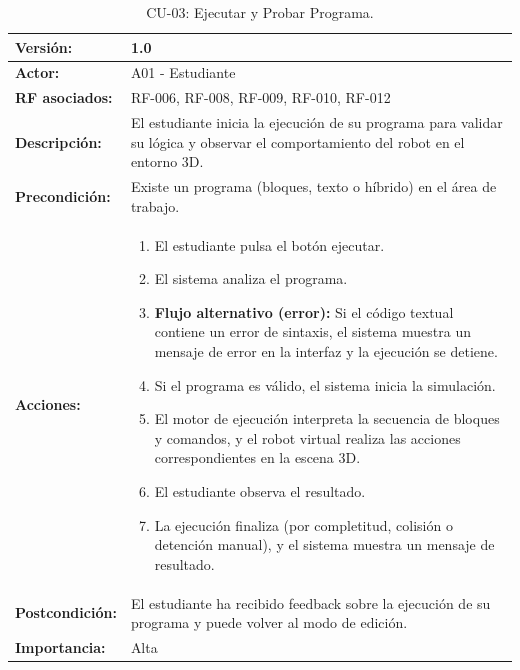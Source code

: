 \begin{table}[H]
	\centering
	\begin{tabularx}{\linewidth}{|p{3cm}|X|}
		\hline
		\textbf{Versión:} & 1.0 \\ \hline
		\textbf{Actor:} & A01 - Estudiante \\ \hline
		\textbf{RF asociados:} & RF-006, RF-008, RF-009, RF-010, RF-012 \\ \hline
		\textbf{Descripción:} & El estudiante inicia la ejecución de su programa para validar su lógica y observar el comportamiento del robot en el entorno 3D. \\ \hline
		\textbf{Precondición:} & Existe un programa (bloques, texto o híbrido) en el área de trabajo. \\ \hline
		\textbf{Acciones:} & 
		\begin{enumerate}
			\item El estudiante pulsa el botón ejecutar.
			\item El sistema analiza el programa.
			\item \textbf{Flujo alternativo (error):} Si el código textual contiene un error de sintaxis, el sistema muestra un mensaje de error en la interfaz y la ejecución se detiene.
			\item Si el programa es válido, el sistema inicia la simulación.
			\item El motor de ejecución interpreta la secuencia de bloques y comandos, y el robot virtual realiza las acciones correspondientes en la escena 3D.
			\item El estudiante observa el resultado.
			\item La ejecución finaliza (por completitud, colisión o detención manual), y el sistema muestra un mensaje de resultado.
		\end{enumerate} \\ \hline
		\textbf{Postcondición:} & El estudiante ha recibido feedback sobre la ejecución de su programa y puede volver al modo de edición. \\ \hline
		\textbf{Importancia:} & Alta \\ \hline
	\end{tabularx}
	\caption{CU-03: Ejecutar y Probar Programa.}
	\label{tabla:CU03}
\end{table}

